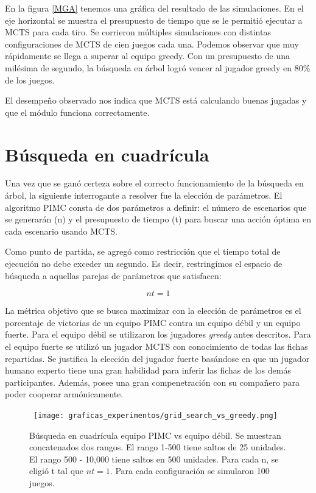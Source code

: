 En la figura \ref{MGA} tenemos una gráfica del resultado de las simulaciones. En
el eje horizontal se muestra el presupuesto de tiempo que se le permitió
ejecutar a MCTS para cada tiro. Se corrieron múltiples simulaciones con
distintas configuraciones de MCTS de cien juegos cada una. Podemos observar que
muy rápidamente se llega a superar al equipo greedy. Con un presupuesto de una
milésima de segundo, la búsqueda en árbol logró vencer al jugador greedy en 80\%
de los juegos.

El desempeño observado nos indica que MCTS está calculando buenas jugadas y que
el módulo funciona correctamente.


\section{Búsqueda en cuadrícula}

Una vez que se ganó certeza sobre el correcto funcionamiento de la búsqueda en
árbol, la siguiente interrogante a resolver fue la elección de parámetros. El
algoritmo PIMC consta de dos parámetros a definir: el número de escenarios que
se generarán (n) y el presupuesto de tiempo (t) para buscar una acción óptima en
cada escenario usando MCTS.

Como punto de partida, se agregó como restricción que el tiempo total de
ejecución no debe exceder un segundo. Es decir, restringimos el espacio de
búsqueda a aquellas parejas de parámetros que satisfacen: 


\[nt = 1 \]

La métrica objetivo que se busca maximizar con la elección de parámetros es el
porcentaje de victorias de un equipo PIMC contra un equipo débil y un equipo
fuerte. Para el equipo débil se utilizaron los jugadores \textit{greedy} antes
descritos. Para el equipo fuerte se utilizó un jugador MCTS con conocimiento de
todas las fichas repartidas. Se justifica la elección del jugador fuerte
basándose en que un jugador humano experto tiene una gran habilidad para inferir
las fichas de los demás participantes. Además, posee una gran compenetración con
su compañero para poder cooperar armónicamente.

\begin{figure}[ht]
    \begin{center}
        \hbox{\hspace{-2em}
        \texttt{[image: graficas\_experimentos/grid\_search\_vs\_greedy.png]}}
        \caption{Búsqueda en cuadrícula equipo PIMC vs equipo débil. Se muestran
        concatenados dos rangos. El rango 1-500 tiene saltos de 25 unidades. El
        rango 500 - 10,000 tiene saltos en 500 unidades. Para cada n, se eligió
        t tal que \(nt = 1\). Para cada configuración se simularon 100 juegos.}
        \label{GSW}
    \end{center}
\end{figure}

